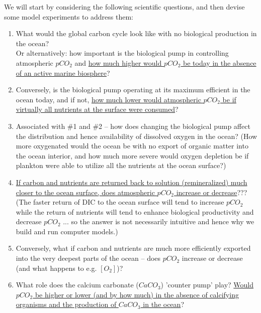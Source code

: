 \vspace{1mm}

We will start by considering the following scientific questions, and then devise some model experiments to address them:

\begin{enumerate}[noitemsep]
\vspace{1mm}
\item What would the global carbon cycle look like with no biological production in the ocean? \\Or alternatively: how important is the biological pump in controlling atmospheric \(pCO_{2}\) and \uline{how much higher would \(pCO_{2}\) be today in the absence of an active marine biosphere}?
\vspace{1mm}
\item Conversely, is the biological pump operating at its maximum efficient in the ocean today, and if not, \uline{how much lower would atmospheric \(pCO_{2}\) be if virtually all nutrients at the surface were consumed}?
\vspace{1mm}
\item Associated with \#1 and \#2 -- how does changing the biological pump affect the distribution and hence availability of dissolved oxygen in the ocean? (How more oxygenated would the ocean be with no export of organic matter into the ocean interior, and how much more severe would oxygen depletion be if plankton were able to utilize all the nutrients at the ocean surface?)
\vspace{1mm}
\item \uline{If carbon and nutrients are returned back to solution (remineralized) much closer to the ocean surface, does atmospheric \(pCO_{2}\) increase or decrease}??? (The faster return of DIC to the ocean surface will tend to increase \(pCO_{2}\) while the return of nutrients will tend to enhance biological productivity and decrease \(pCO_{2}\) ... so the answer is not necessarily intuitive and hence why we build and run computer models.)
\vspace{1mm}
\item Conversely, what if carbon and nutrients are much more efficiently exported into the very deepest parts of the ocean -- does \(pCO_{2}\) increase or decrease (and what happens to e.g. \([O_{2}]\))?
\vspace{1mm}
\item What role does the calcium carbonate (\(CaCO_{3}\)) 'counter pump' play? \uline{Would \(pCO_{2}\) be higher or lower (and by how much) in the absence of calcifying organisms and the production of \(CaCO_{3}\) in the ocean}?

\end{enumerate}
